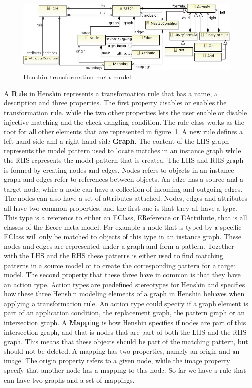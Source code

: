 \begin{figure}[H]
	\centering
	\includegraphics[scale=0.8]{./Figures/Henshin_metamodel.png}
	\caption[Henshin transformation meta-model]
	{Henshin transformation meta-model\cite{Arendt2010}.}
	\label{fig:Henshin_metamodel}
\end{figure}

A \textbf{Rule} in Henshin represents a transformation rule that has a name,
a description and three properties. The first property disables or enables the
transformation rule, while the two other properties lets the user enable or
disable injective matching and the check dangling condition. The rule class
works as the root for all other elements that are represented in 
figure~\ref{fig:Henshin_metamodel}. A new rule defines a left hand side and a
right hand side \textbf{Graph}. The content of the LHS graph represents the
model pattern used to locate matches in an instance graph while the RHS
represents the model pattern that is created. The LHS and RHS graph is formed by
creating nodes and edges. Nodes refers to objects in an instance graph and
edges refer to references between objects. An edge has a source and a target
node, while a node can have a collection of incoming and outgoing edges. The
nodes can also have a set of attributes attached. Nodes, edges and attributes
all have two common properties, and the first one is that they all have a type.
This type is a reference to either an EClass, EReference or EAttribute, that is
all classes of the Ecore meta-model. For example a node that is typed by a
specific EClass will only be matched to objects of this type in an instance
graph. These nodes and edges are represented under a graph and form a pattern.
Together with the LHS and the RHS these patterns is either used to find
matching patterns in a source model or to create the corresponding pattern for
a target model. The second property that these three have in common is that
they have an action type. Action types are predefined stereotypes for Henshin
and specifies how these three Henshin modeling elements of a graph in Henshin
behaves when applying a transformation rule. An action type could specify if a
graph element is part of an application condition, the replacement graph, the
pattern graph or an intersection graph. A \textbf{Mapping} is how
Henshin specifies if nodes are part of this intersection graph, and that is
nodes that are part of both the LHS and the RHS graph. This means that these
objects should be part of the matching pattern, but should not be deleted. A
mapping has two properties, namely an origin and an image. The origin property
refers to a given node, while the image property specify that another node has
a mapping to this node. So far we have a rule that can have two graphs and a
set of mappings. 

